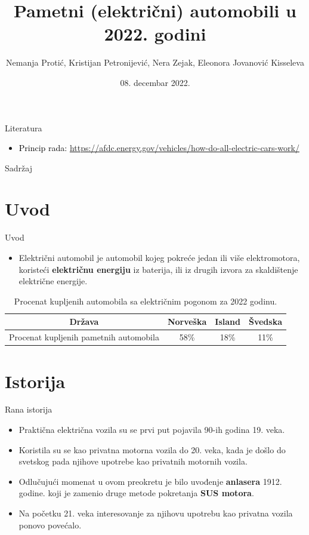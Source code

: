 \documentclass[11pt]{beamer}
\author{Nemanja Protić, Kristijan Petronijević, Nera Zejak, Eleonora Jovanović Kisseleva}
\title{Pametni (električni) automobili u 2022. godini}
\institute[]{Matematički fakultet Univertziteta u Beogradu}
\date{08. decembar 2022.}
\begin{document}
\begin{frame}
\titlepage
\end{frame}

\begin{frame}{Literatura}
\begin{itemize}

\item \textcolor{black}{{\footnotesize Princip rada:}} {\footnotesize \url{ https://afdc.energy.gov/vehicles/how-do-all-electric-cars-work/}}

\end{itemize}
\end{frame}

\begin{frame}{Sadržaj}
\tableofcontents 
\end{frame}

\section{Uvod}

\begin{frame}{Uvod}
\begin{itemize}
    \item  Električni automobil  je automobil kojeg pokreće jedan ili više elektromotora, koristeći \textbf{električnu energiju} iz baterija, ili iz drugih izvora za skaldištenje električne energije.
\end{itemize}
\begin{table}[htb]
        \caption{Procenat kupljenih automobila sa električnim pogonom za 2022 godinu.}
        \label{tab:modelo_tabela}
        \centering
       \begin{tabular}{|c|c|c|c|} \hline
Država& Norveška& Island& Švedska\\ \hline
Procenat kupljenih pametnih automobila& 58\%& 18\%& 11\%\\ \hline
\end{tabular}
        
       
    \end{table}

\end{frame}

\section{Istorija}
\begin{frame}{Rana istorija}
\begin{itemize}
    \item Praktična električna vozila su se prvi put pojavila 90-ih godina 19. veka.
    \item Koristila su se kao privatna motorna vozila do 20. veka, kada je došlo do svetskog pada njihove upotrebe kao privatnih motornih vozila.
    \item Odlučujući momenat u ovom preokretu je bilo uvođenje \textbf{anlasera} 1912. godine. koji je zamenio druge metode pokretanja \textbf{SUS motora}.
    \item Na početku 21. veka interesovanje za njihovu upotrebu kao privatna vozila ponovo povećalo.
\end{itemize}
\end{frame}
\end{document}
